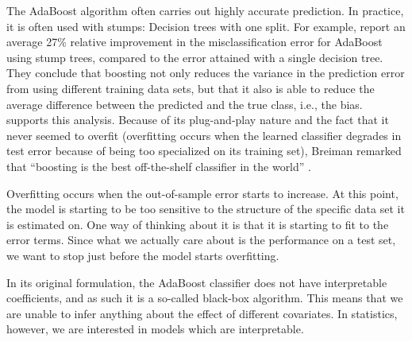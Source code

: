 The AdaBoost algorithm often carries out highly accurate prediction. In practice, it is often used with stumps: Decision trees with one split. For example, \citet{bauer-kohavi} report an average 27\% relative improvement in the misclassification error for AdaBoost using stump trees, compared to the error attained with a single decision tree. They conclude that boosting not only reduces the variance in the prediction error from using different training data sets, but that it also is able to reduce the average difference between the predicted and the true class, i.e., the bias. \citet{breiman1998} supports this analysis. Because of its plug-and-play nature and the fact that it never seemed to overfit (overfitting occurs when the learned classifier degrades in test error because of being too specialized on its training set), Breiman remarked that ``boosting is the best off-the-shelf classifier in the world'' \citep{ESL}.

Overfitting occurs when the out-of-sample error starts to increase. At this point, the model is starting to be too sensitive to the structure of the specific data set it is estimated on. One way of thinking about it is that it is starting to fit to the error terms. Since what we actually care about is the performance on a test set, we want to stop just before the model starts overfitting.

In its original formulation, the AdaBoost classifier does not have interpretable coefficients, and as such it is a so-called black-box algorithm. This means that we are unable to infer anything about the effect of different covariates. In statistics, however, we are interested in models which are interpretable.




